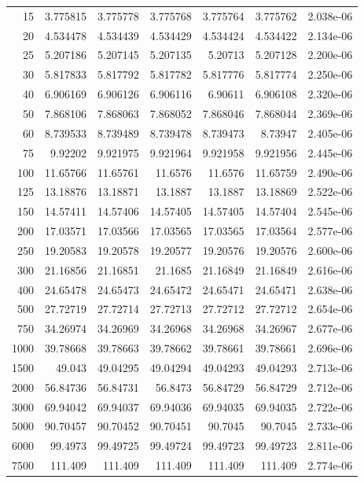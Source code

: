 \begin{longtable}{@{}rrrrrrr@{}}
15 & 3.775815 & 3.775778 & 3.775768 & 3.775764 & 3.775762 & 2.038e-06\\
20 & 4.534478 & 4.534439 & 4.534429 & 4.534424 & 4.534422 & 2.134e-06\\
25 & 5.207186 & 5.207145 & 5.207135 & 5.20713 & 5.207128 & 2.200e-06\\
30 & 5.817833 & 5.817792 & 5.817782 & 5.817776 & 5.817774 & 2.250e-06\\
40 & 6.906169 & 6.906126 & 6.906116 & 6.90611 & 6.906108 & 2.320e-06\\
50 & 7.868106 & 7.868063 & 7.868052 & 7.868046 & 7.868044 & 2.369e-06\\
60 & 8.739533 & 8.739489 & 8.739478 & 8.739473 & 8.73947 & 2.405e-06\\
75 & 9.92202 & 9.921975 & 9.921964 & 9.921958 & 9.921956 & 2.445e-06\\
100 & 11.65766 & 11.65761 & 11.6576 & 11.6576 & 11.65759 & 2.490e-06\\
125 & 13.18876 & 13.18871 & 13.1887 & 13.1887 & 13.18869 & 2.522e-06\\
150 & 14.57411 & 14.57406 & 14.57405 & 14.57405 & 14.57404 & 2.545e-06\\
200 & 17.03571 & 17.03566 & 17.03565 & 17.03565 & 17.03564 & 2.577e-06\\
250 & 19.20583 & 19.20578 & 19.20577 & 19.20576 & 19.20576 & 2.600e-06\\
300 & 21.16856 & 21.16851 & 21.1685 & 21.16849 & 21.16849 & 2.616e-06\\
400 & 24.65478 & 24.65473 & 24.65472 & 24.65471 & 24.65471 & 2.638e-06\\
500 & 27.72719 & 27.72714 & 27.72713 & 27.72712 & 27.72712 & 2.654e-06\\
750 & 34.26974 & 34.26969 & 34.26968 & 34.26968 & 34.26967 & 2.677e-06\\
1000 & 39.78668 & 39.78663 & 39.78662 & 39.78661 & 39.78661 & 2.696e-06\\
1500 & 49.043 & 49.04295 & 49.04294 & 49.04293 & 49.04293 & 2.713e-06\\
2000 & 56.84736 & 56.84731 & 56.8473 & 56.84729 & 56.84729 & 2.712e-06\\
3000 & 69.94042 & 69.94037 & 69.94036 & 69.94035 & 69.94035 & 2.722e-06\\
5000 & 90.70457 & 90.70452 & 90.70451 & 90.7045 & 90.7045 & 2.733e-06\\
6000 & 99.4973 & 99.49725 & 99.49724 & 99.49723 & 99.49723 & 2.811e-06\\
7500 & 111.409 & 111.409 & 111.409 & 111.409 & 111.409 & 2.774e-06\\

\end{longtable}
